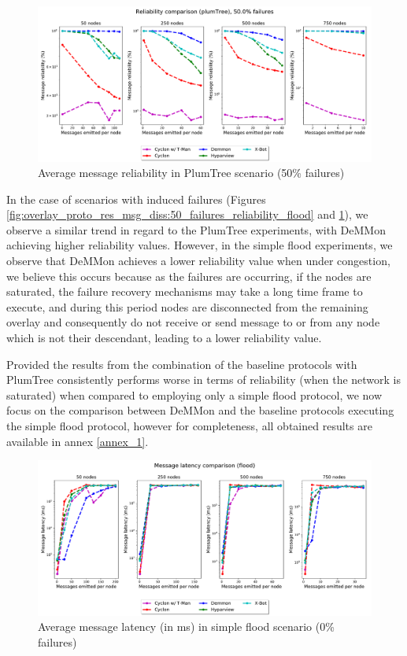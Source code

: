 \begin{figure}[htbp]
    \centering
    \includegraphics[width=\linewidth]{Chapters/evaluation/figures/flood/plumTree_50.0_failures_reliability.pdf}
    \caption{Average message reliability in PlumTree scenario (50\% failures)}
    \label{fig:overlay_proto_res_msg_diss:50_failures_reliability_plumTree}
\end{figure}

In the case of scenarios with induced failures (Figures \ref{fig:overlay_proto_res_msg_diss:50_failures_reliability_flood} and \ref{fig:overlay_proto_res_msg_diss:50_failures_reliability_plumTree}), we observe a similar trend in regard to the PlumTree experiments, with DeMMon achieving higher reliability values. However, in the simple flood experiments, we observe that DeMMon achieves a lower reliability value when under congestion, we believe this occurs because as the failures are occurring, if the nodes are saturated, the failure recovery mechanisms may take a long time frame to execute, and during this period nodes are disconnected from the remaining overlay and consequently do not receive or send message to or from any node which is not their descendant, leading to a lower reliability value.

Provided the results from the combination of the baseline protocols with PlumTree consistently performs worse in terms of reliability (when the network is saturated) when compared to employing only a simple flood protocol, we now focus on the comparison between DeMMon and the baseline protocols executing the simple flood protocol, however for completeness, all obtained results are available in annex \ref{annex_1}.

\begin{figure}[htbp]
    \centering
    \includegraphics[width=\linewidth]{Chapters/evaluation/figures/flood/flood_0.0_failures_msg_lat.pdf}
    \caption{Average message latency (in ms) in simple flood scenario (0\% failures)}
    \label{fig:overlay_proto_res_msg_diss:0_failures_latency_flood}
\end{figure}

